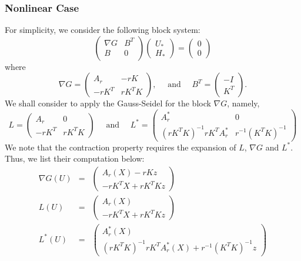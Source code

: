 \begin{itemize}
\subsubsection{Nonlinear Case} 
For simplicity, we consider the following block system: 
\begin{equation}
\begin{pmatrix}
\nabla G  & B^T \\
B  & 0\\
\end{pmatrix} 
\begin{pmatrix}
U_* \\
H_*
\end{pmatrix} = 
\begin{pmatrix}
0\\
0
\end{pmatrix}
\end{equation}
where 
\begin{equation}
\nabla G = \begin{pmatrix}
A_r & -r K\\
-r K^T & rK^T K
\end{pmatrix}, \quad \mbox{ and } \quad 
B^T = \begin{pmatrix}
-I \\K^T
\end{pmatrix}.
\end{equation}
We shall consider to apply the Gauss-Seidel for the block $\nabla G$, namely, 
\begin{equation}
L = \begin{pmatrix}
A_r & 0\\
-r K^T & rK^T K 
\end{pmatrix} 
\quad \mbox{ and } \quad L^{*} = \begin{pmatrix}
A_r^{*} & 0\\
(rK^T K)^{-1} rK^T A_r^{*} & r^{-1} (K^T K)^{-1} 
\end{pmatrix} 
\end{equation}
We note that the contraction property requires the expansion of $L$, $\nabla G$ and $L^*$. Thus, we list their computation below: 
\begin{eqnarray*}
\nabla G(U) &=& 
\begin{pmatrix}
A_r(X) - r K z \\ 
-r K^T X + r K^T K z 
\end{pmatrix} \\ 
L(U) &=& 
\begin{pmatrix}
A_r(X) \\ 
-r K^T X + r K^T K z 
\end{pmatrix} \\ 
L^*(U) &=& 
\begin{pmatrix}
A_r^*(X) \\ 
(r K^TK)^{-1}r K^T A_r^{*}(X) + r^{-1} (K^T K)^{-1} z 
\end{pmatrix} 
\end{eqnarray*}


\end{itemize}
